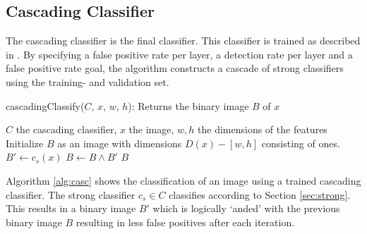 \documentclass[a4paper,11pt]{article}
\begin{document}
\subsection{Cascading Classifier} \label{sec:casc}
The cascading classifier is the final classifier. This classifier is trained as
described in \cite{viola}. By specifying a false positive rate per layer, a
detection rate per layer and a false positive rate goal, the algorithm
constructs a cascade of strong classifiers using the training- and validation
set.
\begin{algorithm}
	\caption{cascadingClassify($C$, $x$, $w$, $h$): Returns the binary image $B$ of $x$}
	\begin{algorithmic}[1]
	\REQUIRE $C$ the cascading classifier, $x$ the image, $w,h$ the dimensions of the features
	\medskip
	\STATE Initialize $B$ as an image with dimensions $D(x) - [w,h]$ consisting of ones.
		\STATE $B' \leftarrow c_s(x)$
		\STATE $B \leftarrow B \land B'$
	\ENDFOR
	\RETURN $B$
	\end{algorithmic}
\label{alg:casc}
\end{algorithm}
Algorithm \ref{alg:casc} shows the classification of an image using a trained
cascading classifier. The strong classifier $c_s \in C$ classifies according to
Section \ref{sec:strong}. This results in a binary image $B'$ which is
logically `anded' with the previous binary image $B$ resulting in less false
positives after each iteration.
\end{document}

